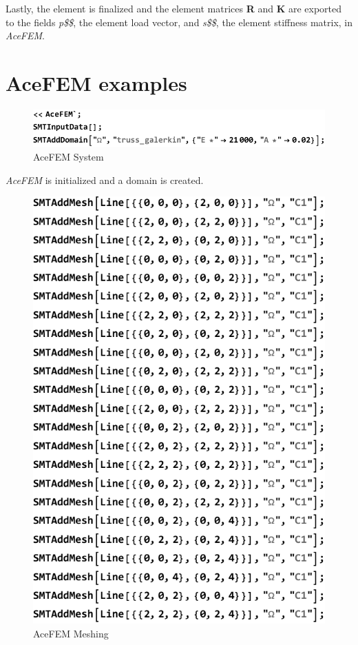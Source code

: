 Lastly, the element is finalized and the element matrices \textbf{R} and \textbf{K} are exported to the fields \textit{p\$\$}, the element load vector, and \textit{s\$\$}, the element stiffness matrix, in \textit{AceFEM}.

\newpage
\section{AceFEM examples}

\begin{figure}[htb]
	\includegraphics{figures/acefem_input_0}
	\caption{AceFEM System}
	\label{fig:AceFEM First Steps}
\end{figure}

\textit{AceFEM} is initialized and a domain is created. 

\begin{figure}[htb]
	\includegraphics{figures/acefem_input_1}
	\caption{AceFEM Meshing}
	\label{fig:Meshing}
\end{figure}

